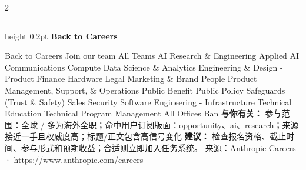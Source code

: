 \documentclass[10.5pt]{ctexart}
\begin{document}
\begin{multicols}{2}
\vspace{2mm}
\hrule height 0.2pt
\vspace{2mm}
{\large\bfseries Back to Careers}\par
Back to Careers Join our team All Teams AI Research \& Engineering Applied AI Communications Compute Data Science \& Analytics Engineering \& Design - Product Finance Hardware Legal Marketing \& Brand People Product Management, Support, \& Operations Public Benefit Public Policy Safeguards (Trust \& Safety) Sales Security Software Engineering - Infrastructure Technical Education Technical Program Management All Offices Ban
\textbf{与你有关：} 参与范围：全球 / 多为海外全职；命中用户订阅版面：opportunity、ai、research；来源接近一手且权威度高；标题/正文包含高信号变化
\textbf{建议：} 检查报名资格、截止时间、参与形式和预期收益；合适则立即加入任务系统。
{\footnotesize\color{ormuted} 来源：Anthropic Careers · \url{https://www.anthropic.com/careers}}
\end{multicols}
\end{document}
